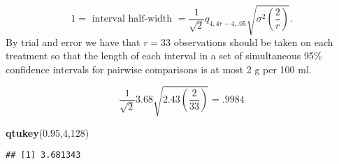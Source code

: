 \documentclass[12pt,]{article}
\newenvironment{Shaded}{\begin{snugshade}}{\end{snugshade}}
\newcommand{\KeywordTok}[1]{\textcolor[rgb]{0.13,0.29,0.53}{\textbf{#1}}}
\newcommand{\DecValTok}[1]{\textcolor[rgb]{0.00,0.00,0.81}{#1}}
\newcommand{\FloatTok}[1]{\textcolor[rgb]{0.00,0.00,0.81}{#1}}
\newcommand{\NormalTok}[1]{#1}
\begin{document}
\[
1 = \text{ interval half-width }= \frac{1}{\sqrt{2}} q_{4,4r-4,.05} \sqrt{\sigma^2 \left( \frac{2}{r}\right)}.
\] By trial and error we have that \(r= 33\) observations should be
taken on each treatment so that the length of each interval in a set of
simultaneous 95\% confidence intervals for pairwise comparisons is at
most 2 g per 100 ml.

\[ \frac{1}{\sqrt{2}} 3.68  \sqrt{2.43 \left( \frac{2}{33}\right)} = .9984\]

\begin{Shaded}
\begin{Highlighting}[]
\KeywordTok{qtukey}\NormalTok{(}\FloatTok{0.95}\NormalTok{,}\DecValTok{4}\NormalTok{,}\DecValTok{128}\NormalTok{)}
\end{Highlighting}
\end{Shaded}

\begin{verbatim}
## [1] 3.681343
\end{verbatim}
\end{document}
